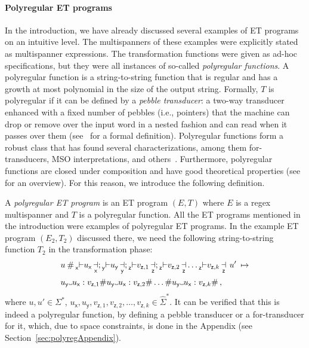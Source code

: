 \documentclass[
a4paper
]{article}
\theoremstyle{plain}
\theoremstyle{definition}
\theoremstyle{remark}
\newcommand\Vtextvisiblespace[1][.3em]{%
	\mbox{\kern.06em\vrule height.3ex}%
	\vbox{\hrule width#1}%
	\hbox{\vrule height.3ex}}
\DeclareMathOperator{\openmark}{\vdash}
\DeclareMathOperator{\closemark}{\dashv}
\newcommand{\open}[1]{\prescript{}{#1}{\openmark}}
\newcommand{\close}[1]{\closemark_{#1}}
\newcommand{\varsx}{\ensuremath{\textsf{x}}}
\newcommand{\varsy}{\ensuremath{\textsf{y}}}
\newcommand{\varsz}{\ensuremath{\textsf{z}}}
\begin{document}
\paragraph{Polyregular ET programs} In the introduction, we have already discussed several examples of ET programs on an intuitive level. The multispanners of these examples were explicitly stated as multispanner expressions. The transformation functions were given as ad-hoc specifications, but they were all instances of 
so-called \emph{polyregular functions}. A polyregular function is a string-to-string function that is regular and has
a growth at most polynomial
in the size of the output string. Formally, $T$ is polyregular if it can be defined by a \emph{pebble transducer}:
a two-way transducer enhanced with a fixed number of pebbles (i.e., pointers) that the machine can drop or remove over the input word in a nested fashion and can read when it passes over them (see~\cite{engelfriet2002two} for a formal definition). Polyregular functions
form a robust class that has found several characterizations,
among them for-transducers, MSO interpretations,
and
others~\cite{Bojanczyk22}. Furthermore, polyregular functions are closed under composition and have good theoretical properties
(see \cite{Bojanczyk22} for an overview).
For this reason, we introduce the following definition.

A \emph{polyregular ET program} is an ET program $(E,T)$ where $E$ is a regex multispanner and $T$ is a polyregular function. All the ET programs mentioned in the introduction were examples of polyregular ET programs. In the example ET program $(E_2, T_2)$ discussed there, we need the following string-to-string function $T_2$ in the transformation phase:
\begin{align*}
&u \: \# \open{\varsx} u_{\varsx} \close{\varsx} ; \open{\varsy} u_{\varsy} \close{\varsy} ; \open{\varsz} v_{\varsz, 1} \close{\varsz}; \open{\varsz} v_{\varsz, 2} \close{\varsz} \ldots \open{\varsz} v_{\varsz, k} \close{\varsz} \: u' \: \mapsto\\
&u_{\varsy} \Vtextvisiblespace u_{\varsx}:v_{\varsz, 1} \# u_{\varsy} \Vtextvisiblespace u_{\varsx}:v_{\varsz, 2} \# \ldots \# u_{\varsy} \Vtextvisiblespace u_{\varsx}:v_{\varsz, k} \#\,,
\end{align*}
where $u, u' \in \Sigma^*$, $u_{\varsx}, u_{\varsy}, v_{\varsz, 1}, v_{\varsz, 2}, \ldots, v_{\varsz, k} \in \widehat{\Sigma}^*$.
It can be verified that this is indeed a polyregular function, by defining a pebble transducer or a for-transducer for it, which, due to space constraints, is done in the Appendix (see Section~\ref{sec:polyregAppendix}). 
\end{document}
